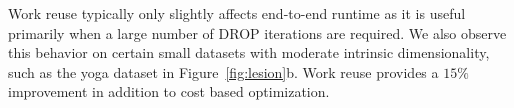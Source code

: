 Work reuse typically only slightly affects end-to-end runtime as it is useful primarily when a large number of DROP iterations are required.
We also observe this behavior on certain small datasets with moderate intrinsic dimensionality, such as the yoga dataset in Figure~\ref{fig:lesion}b. 
Work reuse provides a $15\%$ improvement in addition to cost based optimization.

